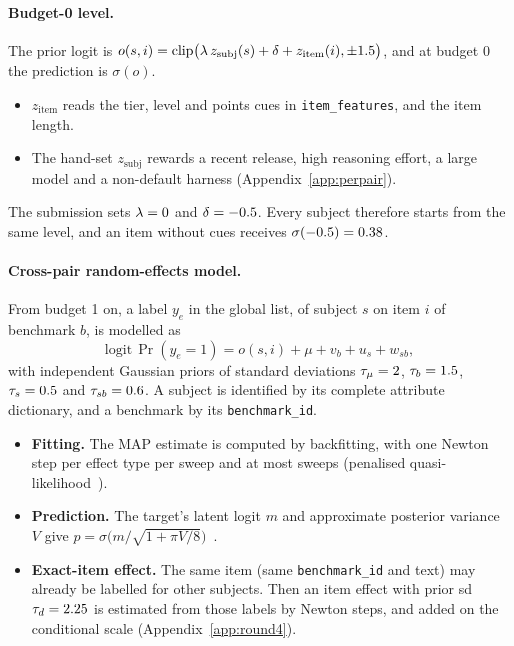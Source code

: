 \documentclass{article}
\begin{document}
\paragraph{Budget-0 level.} The prior logit is $o(s,i)=\mathrm{clip}\big(\lambda\,z_{\mathrm{subj}}(s)+\delta+z_{\mathrm{item}}(i),\pm1.5\big)$, and at budget 0 the prediction is $\sigma(o)$.
\begin{itemize}
\item $z_{\mathrm{item}}$ reads the tier, level and points cues in \texttt{item\_features}, and the item length.
\item The hand-set $z_{\mathrm{subj}}$ rewards a recent release, high reasoning effort, a large model and a non-default harness (Appendix~\ref{app:perpair}).
\end{itemize}
The submission sets $\lambda=0$ and $\delta=-0.5$. Every subject therefore starts from the same level, and an item without cues receives $\sigma(-0.5)=0.38$.

\paragraph{Cross-pair random-effects model.} From budget 1 on, a label $y_e$ in the global list, of subject $s$ on item $i$ of benchmark $b$, is modelled as
\begin{equation}
\mathrm{logit}\,\Pr(y_e=1) = o(s,i) + \mu + v_b + u_s + w_{sb},
\label{eq:xp}
\end{equation}
with independent Gaussian priors of standard deviations $\tau_\mu=2$, $\tau_b=1.5$, $\tau_s=0.5$ and $\tau_{sb}=0.6$. A subject is identified by its complete attribute dictionary, and a benchmark by its \texttt{benchmark\_id}.
\begin{itemize}
\item \textbf{Fitting.} The MAP estimate is computed by backfitting, with one Newton step per effect type per sweep and at most \XpSweeps{} sweeps (penalised quasi-likelihood~\citep{breslow1993}).
\item \textbf{Prediction.} The target's latent logit $m$ and approximate posterior variance $V$ give $p=\sigma\big(m/\sqrt{1+\pi V/8}\big)$~\citep{mackay1992}.
\item \textbf{Exact-item effect.} The same item (same \texttt{benchmark\_id} and text) may already be labelled for other subjects. Then an item effect with prior sd $\tau_d=2.25$ is estimated from those labels by \XpItemNewton{} Newton steps, and added on the conditional scale (Appendix~\ref{app:round4}).
\end{itemize}
\end{document}
